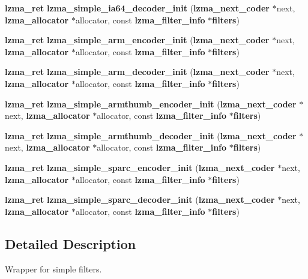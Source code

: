 \begin{DoxyCompactItemize}
\item 
{\bf lzma\-\_\-ret} {\bfseries lzma\-\_\-simple\-\_\-ia64\-\_\-decoder\-\_\-init} ({\bf lzma\-\_\-next\-\_\-coder} $\ast$next, {\bf lzma\-\_\-allocator} $\ast$allocator, const {\bf lzma\-\_\-filter\-\_\-info} $\ast${\bf filters})\label{simple__coder_8h_ab4bed89e53a232474aa07f00401484da}

\item 
{\bf lzma\-\_\-ret} {\bfseries lzma\-\_\-simple\-\_\-arm\-\_\-encoder\-\_\-init} ({\bf lzma\-\_\-next\-\_\-coder} $\ast$next, {\bf lzma\-\_\-allocator} $\ast$allocator, const {\bf lzma\-\_\-filter\-\_\-info} $\ast${\bf filters})\label{simple__coder_8h_ab5a716394b54bc7c1a2188315b7a44e4}

\item 
{\bf lzma\-\_\-ret} {\bfseries lzma\-\_\-simple\-\_\-arm\-\_\-decoder\-\_\-init} ({\bf lzma\-\_\-next\-\_\-coder} $\ast$next, {\bf lzma\-\_\-allocator} $\ast$allocator, const {\bf lzma\-\_\-filter\-\_\-info} $\ast${\bf filters})\label{simple__coder_8h_a8c7ec4a714ebfebf3f4931f46dd137c5}

\item 
{\bf lzma\-\_\-ret} {\bfseries lzma\-\_\-simple\-\_\-armthumb\-\_\-encoder\-\_\-init} ({\bf lzma\-\_\-next\-\_\-coder} $\ast$next, {\bf lzma\-\_\-allocator} $\ast$allocator, const {\bf lzma\-\_\-filter\-\_\-info} $\ast${\bf filters})\label{simple__coder_8h_ad6ccc91844d17926a54d300b371d4293}

\item 
{\bf lzma\-\_\-ret} {\bfseries lzma\-\_\-simple\-\_\-armthumb\-\_\-decoder\-\_\-init} ({\bf lzma\-\_\-next\-\_\-coder} $\ast$next, {\bf lzma\-\_\-allocator} $\ast$allocator, const {\bf lzma\-\_\-filter\-\_\-info} $\ast${\bf filters})\label{simple__coder_8h_a640c44d479fc2ca11a8408ca75d63493}

\item 
{\bf lzma\-\_\-ret} {\bfseries lzma\-\_\-simple\-\_\-sparc\-\_\-encoder\-\_\-init} ({\bf lzma\-\_\-next\-\_\-coder} $\ast$next, {\bf lzma\-\_\-allocator} $\ast$allocator, const {\bf lzma\-\_\-filter\-\_\-info} $\ast${\bf filters})\label{simple__coder_8h_aa916dc142aba2815f843084fc2a93ebd}

\item 
{\bf lzma\-\_\-ret} {\bfseries lzma\-\_\-simple\-\_\-sparc\-\_\-decoder\-\_\-init} ({\bf lzma\-\_\-next\-\_\-coder} $\ast$next, {\bf lzma\-\_\-allocator} $\ast$allocator, const {\bf lzma\-\_\-filter\-\_\-info} $\ast${\bf filters})\label{simple__coder_8h_aad74d819964c254e35777fcb1da4522a}

\end{DoxyCompactItemize}


\subsection{Detailed Description}
Wrapper for simple filters. 